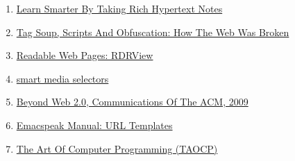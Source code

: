 \documentclass[11pt]{article}
\begin{document}
\begin{enumerate}
\item \href{https://emacspeak.blogspot.com/2022/10/learn-smarter-by-taking-rich-hypertext.html}{Learn Smarter By Taking Rich Hypertext Notes}
\item \href{https://idlewords.com/talks/website\_obesity.htm}{Tag Soup, Scripts And Obfuscation: How The Web Was Broken}
\item \href{https://github.com/eafer/rdrview}{Readable Web Pages: RDRView}
\item \href{https://emacspeak.blogspot.com/2024/03/updated-smart-media-selector-for-audio.html}{smart media selectors}
\item \href{https://research.google/blog/beyond-web-20/?hl=in\&m=1}{Beyond Web 2.0, Communications Of The ACM, 2009}
\item \href{https://tvraman.github.io/emacspeak/manual/URL-Templates.html}{Emacspeak Manual: URL Templates}
\item \href{https://www-cs-faculty.stanford.edu/\~knuth/taocp.html}{The Art Of Computer Programming (TAOCP)}
\end{enumerate}
\end{document}
